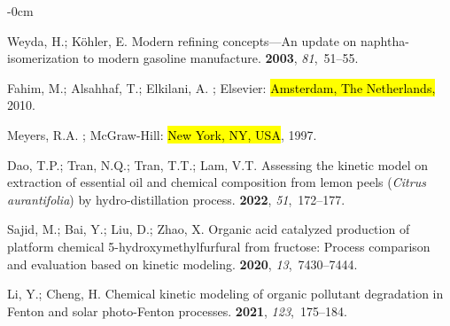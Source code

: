 \documentclass[mathematics,article,accept,pdftex,moreauthors]{Definitions/mdpi}
\begin{document}
	
	\begin{adjustwidth}{-\extralength}{0cm}
		
		
		
		\begin{thebibliography}{999}

Weyda, H.; Köhler, E.
\newblock Modern refining concepts—An update on naphtha-isomerization to
  modern gasoline manufacture.
 {\bf 2003}, {\em 81},~51--55.

Fahim, M.; Alsahhaf, T.; Elkilani, A.
; Elsevier:  \hl{Amsterdam, The Netherlands,} %
 2010.

Meyers, R.A.
; McGraw-Hill: \hl{New York, NY, USA},  1997.

Dao, T.P.; Tran, N.Q.; Tran, T.T.; Lam, V.T.
\newblock Assessing the kinetic model on extraction of essential oil and
  chemical composition from lemon peels (\emph{Citrus aurantifolia}) by
  hydro-distillation process.
 {\bf 2022}, {\em 51},~172--177.

Sajid, M.; Bai, Y.; Liu, D.; Zhao, X.
\newblock Organic acid catalyzed production of platform chemical
  5-hydroxymethylfurfural from fructose: Process comparison and evaluation
  based on kinetic modeling.
 {\bf 2020}, {\em 13},~7430--7444.

Li, Y.; Cheng, H.
\newblock Chemical kinetic modeling of organic pollutant degradation in Fenton
  and solar photo-Fenton processes.
 {\bf
  2021}, {\em 123},~175--184.


\end{thebibliography}
\end{adjustwidth}
\end{document}
